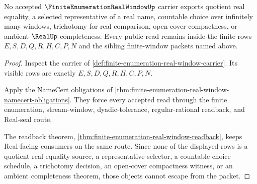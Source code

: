 \begin{theorem}
\label{thm:finite-enumeration-real-window-nonescape}
No accepted $\FiniteEnumerationRealWindowUp$ carrier exports quotient real equality, a selected representative of a real name, countable choice over infinitely many windows, trichotomy for real comparison, open-cover compactness, or ambient $\RealUp$ completeness. Every public read remains inside the finite rows $E,S,D,Q,R,H,C,P,N$ and the sibling finite-window packets named above.
\end{theorem}
\begin{proof}
Inspect the carrier of \autoref{def:finite-enumeration-real-window-carrier}. Its visible rows are exactly $E,S,D,Q,R,H,C,P,N$.

Apply the NameCert obligations of \autoref{thm:finite-enumeration-real-window-namecert-obligations}. They force every accepted read through the finite enumeration, stream-window, dyadic-tolerance, regular-rational readback, and Real-seal route.

The readback theorem, \autoref{thm:finite-enumeration-real-window-readback}, keeps Real-facing consumers on the same route. Since none of the displayed rows is a quotient-real equality source, a representative selector, a countable-choice schedule, a trichotomy decision, an open-cover compactness witness, or an ambient completeness theorem, those objects cannot escape from the packet.
\end{proof}


\begin{closurestatus}{\FiniteEnumerationRealWindowUp}
  \theoryclosure{\seedClosure}
  \formalstatus{\unformalizedV}
\end{closurestatus}
